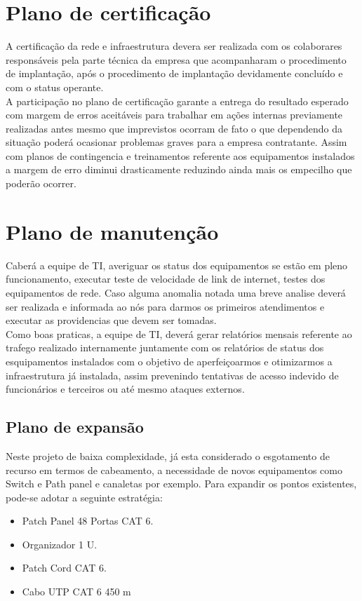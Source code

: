 \documentclass[	DIV=calc,%
							paper=a4,%
							fontsize=12pt,%
							onecolumn]{scrartcl}	 					%
\begin{document}
\section{Plano de certificação}
A certificação da rede e infraestrutura devera ser realizada com os colaborares responsáveis pela parte técnica da empresa que acompanharam o procedimento de implantação, após o procedimento de implantação devidamente concluído e com o status operante.
\\

A participação no plano de certificação garante a entrega do resultado esperado com margem de erros aceitáveis para trabalhar em ações internas previamente realizadas antes mesmo que imprevistos ocorram de fato o que dependendo da situação poderá ocasionar problemas graves para a empresa contratante. Assim com planos de contingencia e treinamentos referente aos equipamentos instalados a margem de erro diminui drasticamente  reduzindo ainda mais os  empecilho que poderão ocorrer. 


\section{Plano de manutenção}
Caberá a equipe de TI, averiguar os status dos equipamentos se estão em pleno funcionamento, executar teste de velocidade de link de internet, testes dos equipamentos de rede. Caso alguma anomalia notada uma breve analise deverá ser realizada e informada ao nós para darmos os primeiros atendimentos e executar as providencias que devem ser tomadas.
\\

Como boas praticas, a equipe de TI, deverá gerar relatórios mensais referente ao trafego realizado internamente juntamente com os relatórios de status dos esquipamentos instalados com o objetivo de aperfeiçoarmos e otimizarmos a infraestrutura já instalada, assim prevenindo tentativas de acesso indevido de funcionários e terceiros ou até mesmo ataques externos.


\subsection{Plano de expansão}
Neste projeto de baixa complexidade, já esta considerado o esgotamento de recurso em termos de cabeamento, a necessidade de novos equipamentos como Switch e Path panel e canaletas por exemplo. Para expandir os pontos existentes, pode-se adotar a seguinte estratégia:
\begin{itemize}
	\item Patch Panel 48 Portas CAT 6.
	\item Organizador 1 U.
	\item Patch Cord CAT 6. 
	\item Cabo UTP CAT 6 450 m
\end{itemize}
\end{document}
